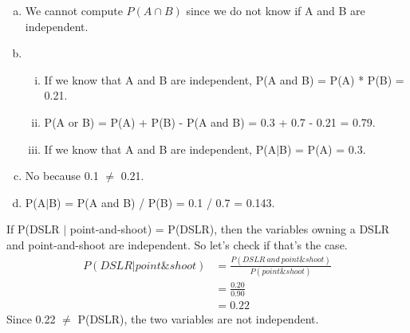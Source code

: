 {
\begin{enumerate}[(a)]
\item We cannot compute $P(A \cap B)$ since we do not know if A and B are independent.
\item
\begin{enumerate}[(i)]
\item If we know that A and B are independent, P(A and B) = P(A) * P(B) = 0.21.
\item P(A or B) = P(A) + P(B) - P(A and B) =  0.3 + 0.7 - 0.21 = 0.79.
\item If we know that A and B are independent, P(A$|$B) = P(A) = 0.3. 
\end{enumerate}
\item No because 0.1 $\ne$ 0.21.
\item P(A$|$B) = P(A and B) / P(B) = 0.1 / 0.7 = 0.143.
\end{enumerate}
}


{
If P(DSLR $|$ point-and-shoot) = P(DSLR), then the variables owning a DSLR and point-and-shoot are independent. So let's check if that's the case. \\
\begin{align*}
P(DSLR | point\&shoot) &= \frac{P(DSLR~and~point\&shoot)}{P(point\&shoot)} \\
&= \frac{0.20}{0.90} \\
&= 0.22
\end{align*}
Since 0.22 $\ne$ P(DSLR), the two variables are not independent.
}

